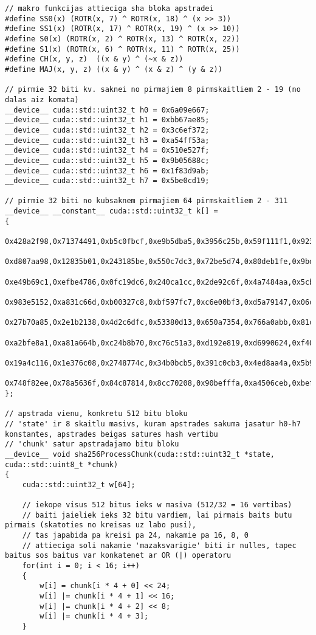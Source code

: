 \documentclass[12pt]{report}%
\theoremstyle{definition}
\begin{document}
\begin{lstlisting}[caption={Paroļu lauzēja implementācija CUDA vidē},
  label=lst:cuda_impl,
  captionpos=t
  ]
// makro funkcijas attieciga sha bloka apstradei
#define SS0(x) (ROTR(x, 7) ^ ROTR(x, 18) ^ (x >> 3))
#define SS1(x) (ROTR(x, 17) ^ ROTR(x, 19) ^ (x >> 10))
#define S0(x) (ROTR(x, 2) ^ ROTR(x, 13) ^ ROTR(x, 22))
#define S1(x) (ROTR(x, 6) ^ ROTR(x, 11) ^ ROTR(x, 25))
#define CH(x, y, z)  ((x & y) ^ (~x & z))
#define MAJ(x, y, z) ((x & y) ^ (x & z) ^ (y & z))

// pirmie 32 biti kv. saknei no pirmajiem 8 pirmskaitliem 2 - 19 (no dalas aiz komata)
__device__ cuda::std::uint32_t h0 = 0x6a09e667;
__device__ cuda::std::uint32_t h1 = 0xbb67ae85;
__device__ cuda::std::uint32_t h2 = 0x3c6ef372;
__device__ cuda::std::uint32_t h3 = 0xa54ff53a;
__device__ cuda::std::uint32_t h4 = 0x510e527f;
__device__ cuda::std::uint32_t h5 = 0x9b05688c;
__device__ cuda::std::uint32_t h6 = 0x1f83d9ab;
__device__ cuda::std::uint32_t h7 = 0x5be0cd19;

// pirmie 32 biti no kubsaknem pirmajiem 64 pirmskaitliem 2 - 311
__device__ __constant__ cuda::std::uint32_t k[] =
{
    0x428a2f98,0x71374491,0xb5c0fbcf,0xe9b5dba5,0x3956c25b,0x59f111f1,0x923f82a4,0xab1c5ed5,
    0xd807aa98,0x12835b01,0x243185be,0x550c7dc3,0x72be5d74,0x80deb1fe,0x9bdc06a7,0xc19bf174,
    0xe49b69c1,0xefbe4786,0x0fc19dc6,0x240ca1cc,0x2de92c6f,0x4a7484aa,0x5cb0a9dc,0x76f988da,
    0x983e5152,0xa831c66d,0xb00327c8,0xbf597fc7,0xc6e00bf3,0xd5a79147,0x06ca6351,0x14292967,
    0x27b70a85,0x2e1b2138,0x4d2c6dfc,0x53380d13,0x650a7354,0x766a0abb,0x81c2c92e,0x92722c85,
    0xa2bfe8a1,0xa81a664b,0xc24b8b70,0xc76c51a3,0xd192e819,0xd6990624,0xf40e3585,0x106aa070,
    0x19a4c116,0x1e376c08,0x2748774c,0x34b0bcb5,0x391c0cb3,0x4ed8aa4a,0x5b9cca4f,0x682e6ff3,
    0x748f82ee,0x78a5636f,0x84c87814,0x8cc70208,0x90befffa,0xa4506ceb,0xbef9a3f7,0xc67178f2
};

// apstrada vienu, konkretu 512 bitu bloku 
// 'state' ir 8 skaitlu masivs, kuram apstrades sakuma jasatur h0-h7 konstantes, apstrades beigas satures hash vertibu
// 'chunk' satur apstradajamo bitu bloku
__device__ void sha256ProcessChunk(cuda::std::uint32_t *state, cuda::std::uint8_t *chunk)
{
    cuda::std::uint32_t w[64];

    // iekope visus 512 bitus ieks w masiva (512/32 = 16 vertibas)
    // baiti jaieliek ieks 32 bitu vardiem, lai pirmais baits butu pirmais (skatoties no kreisas uz labo pusi),
    // tas japabida pa kreisi pa 24, nakamie pa 16, 8, 0
    // attieciga soli nakamie 'mazaksvarigie' biti ir nulles, tapec baitus sos baitus var konkatenet ar OR (|) operatoru 
    for(int i = 0; i < 16; i++)
    {
        w[i] = chunk[i * 4 + 0] << 24;
        w[i] |= chunk[i * 4 + 1] << 16;
        w[i] |= chunk[i * 4 + 2] << 8;
        w[i] |= chunk[i * 4 + 3];
    }


\end{lstlisting}
\end{document}
